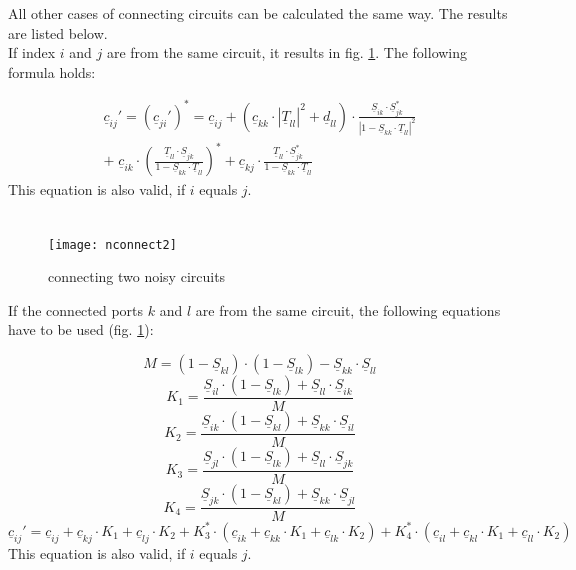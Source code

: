 \documentclass[10pt]{report}
\begin{document}
All other cases of connecting circuits can be calculated the
same way. The results are listed below.\\
If index $i$ and $j$ are from the same circuit, it results in
fig. \ref{fig:nconnect2}. The following formula holds:

\begin{equation}
\begin{split}
\underline{c}_{ij}' = (\underline{c}_{ji}')^* = \underline{c}_{ij} +
   (\underline{c}_{kk}\cdot|\underline{T}_{ll}|^2 + \underline{d}_{ll})\cdot
   \frac{\underline{S}_{ik}\cdot\underline{S}_{jk}^*}{|1-\underline{S}_{kk}\cdot\underline{T}_{ll}|^2}
\\ + \;\underline{c}_{ik}\cdot
     \left(\frac{\underline{T}_{ll}\cdot\underline{S}_{jk}}
                {1-\underline{S}_{kk}\cdot\underline{T}_{ll}}\right)^*
   + \underline{c}_{kj}\cdot
     \frac{\underline{T}_{ll}\cdot\underline{S}_{jk}^*}{1-\underline{S}_{kk}\cdot\underline{T}_{ll}}
\end{split}
\end{equation}
This equation is also valid, if $i$ equals $j$.\\ \\

\begin{figure}[ht]
\begin{center}
\texttt{[image: nconnect2]}
\end{center}
\caption{connecting two noisy circuits}
\label{fig:nconnect2}
\end{figure}
\FloatBarrier


If the connected ports $k$ and $l$ are from the same circuit, the
following equations have to be used (fig. \ref{fig:nconnect2}):

\begin{equation}
M = (1-\underline{S}_{kl})\cdot(1-\underline{S}_{lk}) - \underline{S}_{kk}\cdot\underline{S}_{ll}
\end{equation}
\begin{equation}
K_1 = \frac{\underline{S}_{il}\cdot(1-\underline{S}_{lk}) + \underline{S}_{ll}\cdot\underline{S}_{ik}} {M}
\end{equation}
\begin{equation}
K_2 = \frac{\underline{S}_{ik}\cdot(1-\underline{S}_{kl}) + \underline{S}_{kk}\cdot\underline{S}_{il}} {M}
\end{equation}
\begin{equation}
K_3 = \frac{\underline{S}_{jl}\cdot(1-\underline{S}_{lk}) + \underline{S}_{ll}\cdot\underline{S}_{jk}} {M}
\end{equation}
\begin{equation}
K_4 = \frac{\underline{S}_{jk}\cdot(1-\underline{S}_{kl}) + \underline{S}_{kk}\cdot\underline{S}_{jl}} {M}
\end{equation}
\begin{equation}
\underline{c}_{ij}' = \underline{c}_{ij} + \underline{c}_{kj}\cdot K_1 + \underline{c}_{lj}\cdot K_2
   + K_3^*\cdot(\underline{c}_{ik} + \underline{c}_{kk}\cdot K_1 + \underline{c}_{lk}\cdot K_2)
   + K_4^*\cdot(\underline{c}_{il} + \underline{c}_{kl}\cdot K_1 + \underline{c}_{ll}\cdot K_2)
\end{equation}
This equation is also valid, if $i$ equals $j$.
\end{document}

